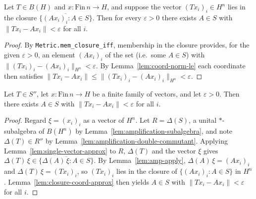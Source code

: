\begin{lemma}
    \label{lem:closure-coord-approx}
    \leanok
    Let $T \in B(H)$ and $x : \mathrm{Fin}\, n \to H$, and suppose the vector
    $(T x_i)_i \in H^n$ lies in the closure $\overline{\{(A x_i)_i : A \in S\}}$.
    Then for every $\varepsilon > 0$ there exists $A \in S$ with
    $\|T x_i - A x_i\| < \varepsilon$ for all $i$.
\end{lemma}
\begin{proof}
    By \texttt{Metric.mem\_closure\_iff}, membership in the closure provides, for
    the given $\varepsilon > 0$, an element $(A x_i)_i$ of the set (i.e.\ some
    $A \in S$) with $\|(T x_i)_i - (A x_i)_i\|_{H^n} < \varepsilon$. By
    Lemma~\ref{lem:coord-norm-le} each coordinate then satisfies
    $\|T x_i - A x_i\| \le \|(T x_i)_i - (A x_i)_i\|_{H^n} < \varepsilon$.
\end{proof}

\begin{lemma}
    \label{lem:double-commutant-approx}
    \leanok
    Let $T \in S''$, let $x : \mathrm{Fin}\, n \to H$ be a finite family of
    vectors, and let $\varepsilon > 0$. Then there exists $A \in S$ with
    $\|T x_i - A x_i\| < \varepsilon$ for all $i$.
\end{lemma}
\begin{proof}
    Regard $\xi = (x_i)_i$ as a vector of $H^n$. Let $R = \Delta(S)$, a unital
    $*$-subalgebra of $B(H^n)$ by Lemma~\ref{lem:amplification-subalgebra}, and
    note $\Delta(T) \in R''$ by
    Lemma~\ref{lem:amplification-double-commutant}. Applying
    Lemma~\ref{lem:single-vector-approx} to $R$, $\Delta(T)$ and the vector
    $\xi$ gives $\Delta(T)\,\xi \in \overline{\{\Delta(A)\,\xi : A \in S\}}$.
    By Lemma~\ref{lem:amp-apply}, $\Delta(A)\,\xi = (A x_i)_i$ and
    $\Delta(T)\,\xi = (T x_i)_i$, so $(T x_i)_i$ lies in the closure of
    $\{(A x_i)_i : A \in S\}$ in $H^n$. Lemma~\ref{lem:closure-coord-approx} then
    yields $A \in S$ with $\|T x_i - A x_i\| < \varepsilon$ for all $i$.
\end{proof}

